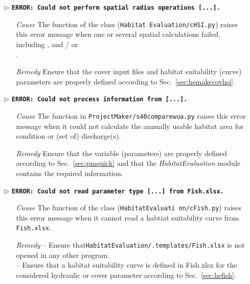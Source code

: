 \begin{itemize}
	\item[$\triangleright$]\textbf{\texttt{ERROR: Could not perform spatial radius operations [...].}}
	\begin{itemize}
		\item[\textit{Cause}\hspace{0.27cm}] The  function of the  class (\texttt{Habitat Evaluation/cHSI.py}) raises this error message when one or several spatial calculations failed, including ,  and / or \\ .
		\item[\textit{Remedy}] Ensure that the cover input files and habitat suitability (curve) parameters are properly defined according to Sec.~\ref{sec:hemakecovhsi}.\\
	\end{itemize}
	
	\item[$\triangleright$]\textbf{\texttt{ERROR: Could not process information from [...].}}
	\begin{itemize}
		\item[\textit{Cause}\hspace{0.27cm}] The  function in \texttt{ProjectMaker/s40{\myUnderscore}compare{\myUnderscore}wua.py} raises this error message when it could not calculate the annually usable habitat area for condition or (set of) discharge(s).
		\item[\textit{Remedy}] Ensure that the variable (parameters) are properly defined according to Sec.~\ref{sec:pmquick} and that the \textit{HabitatEvaluation} module contains the required information.\\
	\end{itemize}
		
	\item[$\triangleright$]\textbf{\texttt{ERROR: Could not read parameter type [...] from Fish.xlsx.}}
	\begin{itemize}
		\item[\textit{Cause}\hspace{0.27cm}] The  function of the  class (\texttt{HabitatEvaluati on/cFish.py}) raises this error message when it cannot read a habtiat suitability curve from \texttt{Fish.xlsx}.
		\item[\textit{Remedy}] -- Ensure that\texttt{HabitatEvaluation/.templates/Fish.xlsx} is not opened in any other program.\\
							   -- Ensure that a habitat suitability curve is defined in {Fish.xlsx} for the considered hydraulic or cover parameter according to Sec.~\ref{sec:hefish}.\\
	\end{itemize}	
	

\end{itemize}
